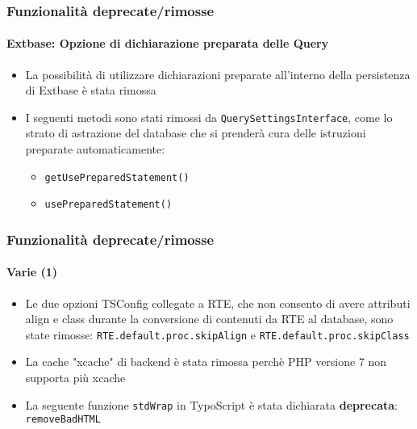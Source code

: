\begin{frame}[fragile]
	\frametitle{Funzionalità deprecate/rimosse}
	\framesubtitle{Extbase: Opzione di dichiarazione preparata delle Query}

	\begin{itemize}

		\item La possibilità di utilizzare dichiarazioni preparate all'interno della persistenza di Extbase è stata rimossa

		\item I seguenti metodi sono stati rimossi da \texttt{QuerySettingsInterface},
			come lo strato di astrazione del database che si prenderà cura delle istruzioni preparate automaticamente:

			\begin{itemize}
				\item \texttt{getUsePreparedStatement()}
				\item \texttt{usePreparedStatement()}
			\end{itemize}

	\end{itemize}

\end{frame}


\begin{frame}[fragile]
	\frametitle{Funzionalità deprecate/rimosse}
	\framesubtitle{Varie (1)}

	\begin{itemize}

		\item Le due opzioni TSConfig collegate a RTE, che non consento di avere attributi align e class durante la conversione
			di contenuti da RTE al database, sono state rimosse:\newline
			\small
				\texttt{RTE.default.proc.skipAlign} e \texttt{RTE.default.proc.skipClass}
			\normalsize

		\item La cache "xcache" di backend è stata rimossa perchè PHP versione 7 non supporta più xcache

		\item La seguente funzione \texttt{stdWrap} in TypoScript è stata dichiarata \textbf{deprecata}:
			\texttt{removeBadHTML}

	\end{itemize}

\end{frame}

